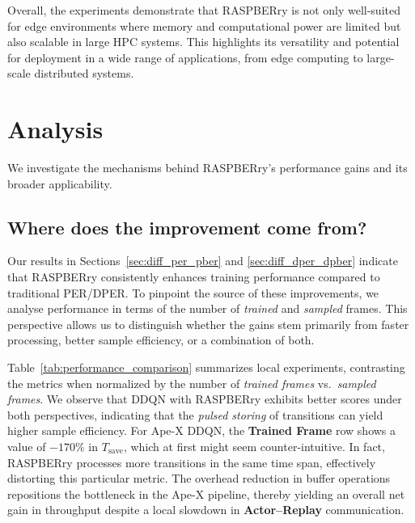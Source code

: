 \documentclass[10pt]{article} %
\begin{document}
Overall, the experiments demonstrate that RASPBERry is not only well-suited for edge environments where memory and computational power are limited but also scalable in large HPC systems.  
This highlights its versatility and potential for deployment in a wide range of applications, from edge computing to large-scale distributed systems.

\section{Analysis}
We investigate the mechanisms behind RASPBERry's performance gains and its broader applicability.
\subsection{Where does the improvement come from?}
\label{sec:where_come_from}

Our results in Sections~\ref{sec:diff_per_pber} and \ref{sec:diff_dper_dpber} indicate that RASPBERry consistently enhances training performance compared to traditional PER/DPER.  
To pinpoint the source of these improvements, we analyse performance in terms of the number of \emph{trained} and \emph{sampled} frames.  
This perspective allows us to distinguish whether the gains stem primarily from faster processing, better sample efficiency, or a combination of both.

Table~\ref{tab:performance_comparison} summarizes local experiments, contrasting the metrics when normalized by the number of \emph{trained frames} vs.\ \emph{sampled frames}.
We observe that DDQN with RASPBERry exhibits better scores under both perspectives, indicating that the \emph{pulsed storing} of transitions can yield higher sample efficiency.  
For Ape-X DDQN, the \textbf{Trained Frame} row shows a value of $-170\%$ in $T_{\text{save}}$, which at first might seem counter-intuitive. 
In fact, RASPBERry processes more transitions in the same time span, effectively distorting this particular metric.
The overhead reduction in buffer operations repositions the bottleneck in the Ape-X pipeline, thereby yielding an overall net gain in throughput despite a local slowdown in \textbf{Actor–Replay} communication.
\end{document}
